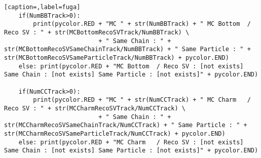 \begin{lstlisting}[caption=,label=fuga]
    if(NumBBTrack>0):
        print(pycolor.RED + "MC " + str(NumBBTrack) + " MC Bottom  / Reco SV : " + str(MCBottomRecoSVTrack/NumBBTrack) \
                          + " Same Chain : " + str(MCBottomRecoSVSameChainTrack/NumBBTrack) + " Same Particle : " + str(MCBottomRecoSVSameParticleTrack/NumBBTrack) + pycolor.END)
    else: print(pycolor.RED + "MC Bottom  / Reco SV : [not exists] Same Chain : [not exists] Same Particle : [not exists]" + pycolor.END)

    if(NumCCTrack>0):
        print(pycolor.RED + "MC " + str(NumCCTrack) + " MC Charm   / Reco SV : " + str(MCCharmRecoSVTrack/NumCCTrack) \
                          + " Same Chain : " + str(MCCharmRecoSVSameChainTrack/NumCCTrack) + " Same Particle : " + str(MCCharmRecoSVSameParticleTrack/NumCCTrack) + pycolor.END)
    else: print(pycolor.RED + "MC Charm   / Reco SV : [not exists] Same Chain : [not exists] Same Particle : [not exists]" + pycolor.END)
\end{lstlisting}

